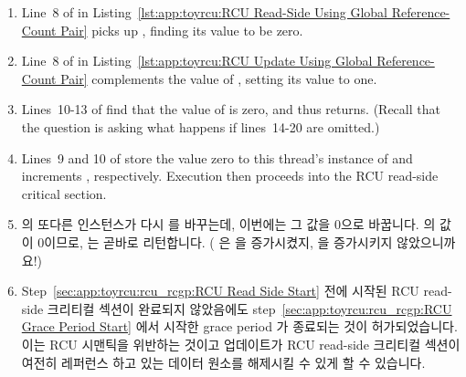 {\begin{enumerate}
	\item	Line~8 of  in
		Listing~\ref{lst:app:toyrcu:RCU Read-Side Using Global Reference-Count Pair}
		picks up , finding its value to be zero.
	\item	Line~8 of  in
		Listing~\ref{lst:app:toyrcu:RCU Update Using Global Reference-Count Pair}
		complements the value of , setting its
		value to one.
	\item	Lines~10-13 of  find that the
		value of  is zero, and thus
		returns.
		(Recall that the question is asking what happens if
		lines~14-20 are omitted.)
	\item	Lines~9 and 10 of  store the
		value zero to this thread's instance of 
		and increments , respectively.
		Execution then proceeds into the RCU read-side critical
		section.
		\label{sec:app:toyrcu:rcu_rcgp:RCU Read Side Start}
	\fi
	\item	{} 의 또다른 인스턴스가 다시 
		를 바꾸는데, 이번에는 그 값을 0으로 바꿉니다.
		 의 값이 0이므로,  는
		곧바로 리턴합니다.
		( 은  을 증가시켰지,
		 을 증가시키지 않았으니까요!)
		\label{sec:app:toyrcu:rcu_rcgp:RCU Grace Period Start}
	\item	Step~\ref{sec:app:toyrcu:rcu_rcgp:RCU Read Side Start} 전에 시작된 RCU
		read-side 크리티컬 섹션이 완료되지 않았음에도
		step~\ref{sec:app:toyrcu:rcu_rcgp:RCU Grace Period Start} 에서 시작한
		grace period 가 종료되는 것이 허가되었습니다.
		이는 RCU 시맨틱을 위반하는 것이고 업데이트가 RCU read-side
		크리티컬 섹션이 여전히 레퍼런스 하고 있는 데이터 원소를
		해제시킬 수 있게 할 수 있습니다.
	\iffalse

	\item	Another instance of \co{synchronize_rcu()} again complements
		\co{rcu_idx}, this time setting its value to zero.
		Because \co{rcu_refcnt[1]} is zero, \co{synchronize_rcu()}
		returns immediately.
		(Recall that \co{rcu_read_lock()} incremented
		\co{rcu_refcnt[0]}, not \co{rcu_refcnt[1]}!)
		\label{sec:app:toyrcu:rcu_rcgp:RCU Grace Period Start}
	\item	The grace period that started in
		step~\ref{sec:app:toyrcu:rcu_rcgp:RCU Grace Period Start}
		has been allowed to end, despite
		the fact that the RCU read-side critical section
		that started beforehand in
		step~\ref{sec:app:toyrcu:rcu_rcgp:RCU Read Side Start}
		has not completed.
		This violates RCU semantics, and could allow the update
		to free a data element that the RCU read-side critical
		section was still referencing.
	\fi
	\end{enumerate}

}
